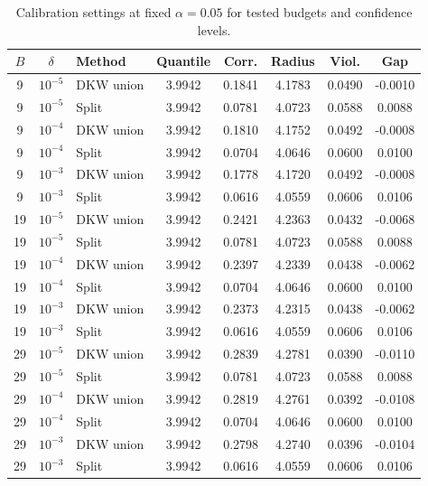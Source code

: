 \documentclass[accepted]{uai2026}
\theoremstyle{plain}
\theoremstyle{definition}
\theoremstyle{remark}
\begin{document}
\begin{table}[h]
\centering
\caption{Calibration settings at fixed $\alpha=0.05$ for tested budgets and confidence levels.}
\label{tab:f1_calibration_representative}
\scriptsize
\begin{tabular}{c c l c c c c c}
\hline
$B$ & $\delta$ & Method & Quantile & Corr. & Radius & Viol. & Gap \\
\hline
9 & $10^{-5}$ & DKW union & 3.9942 & 0.1841 & 4.1783 & 0.0490 & -0.0010 \\
9 & $10^{-5}$ & Split & 3.9942 & 0.0781 & 4.0723 & 0.0588 & 0.0088 \\
9 & $10^{-4}$ & DKW union & 3.9942 & 0.1810 & 4.1752 & 0.0492 & -0.0008 \\
9 & $10^{-4}$ & Split & 3.9942 & 0.0704 & 4.0646 & 0.0600 & 0.0100 \\
9 & $10^{-3}$ & DKW union & 3.9942 & 0.1778 & 4.1720 & 0.0492 & -0.0008 \\
9 & $10^{-3}$ & Split & 3.9942 & 0.0616 & 4.0559 & 0.0606 & 0.0106 \\
19 & $10^{-5}$ & DKW union & 3.9942 & 0.2421 & 4.2363 & 0.0432 & -0.0068 \\
19 & $10^{-5}$ & Split & 3.9942 & 0.0781 & 4.0723 & 0.0588 & 0.0088 \\
19 & $10^{-4}$ & DKW union & 3.9942 & 0.2397 & 4.2339 & 0.0438 & -0.0062 \\
19 & $10^{-4}$ & Split & 3.9942 & 0.0704 & 4.0646 & 0.0600 & 0.0100 \\
19 & $10^{-3}$ & DKW union & 3.9942 & 0.2373 & 4.2315 & 0.0438 & -0.0062 \\
19 & $10^{-3}$ & Split & 3.9942 & 0.0616 & 4.0559 & 0.0606 & 0.0106 \\
29 & $10^{-5}$ & DKW union & 3.9942 & 0.2839 & 4.2781 & 0.0390 & -0.0110 \\
29 & $10^{-5}$ & Split & 3.9942 & 0.0781 & 4.0723 & 0.0588 & 0.0088 \\
29 & $10^{-4}$ & DKW union & 3.9942 & 0.2819 & 4.2761 & 0.0392 & -0.0108 \\
29 & $10^{-4}$ & Split & 3.9942 & 0.0704 & 4.0646 & 0.0600 & 0.0100 \\
29 & $10^{-3}$ & DKW union & 3.9942 & 0.2798 & 4.2740 & 0.0396 & -0.0104 \\
29 & $10^{-3}$ & Split & 3.9942 & 0.0616 & 4.0559 & 0.0606 & 0.0106 \\
\hline
\end{tabular}
\end{table}
\end{document}
